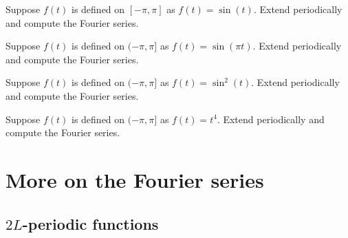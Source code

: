 \setcounter{exercise}{100}

\begin{exercise}
Suppose $f(t)$ is defined on $[-\pi,\pi]$ as $f(t) = \sin(t)$.  Extend
periodically and compute the Fourier series.
\end{exercise}

\begin{exercise}
Suppose $f(t)$ is defined on $(-\pi,\pi]$ as $f(t) = \sin(\pi t)$.  Extend
periodically and compute the Fourier series.
\end{exercise}

\begin{exercise}
Suppose $f(t)$ is defined on $(-\pi,\pi]$ as $f(t) = \sin^2(t)$.
Extend
periodically and compute the Fourier series.
\end{exercise}

\begin{exercise}
Suppose $f(t)$ is defined on $(-\pi,\pi]$ as $f(t) = t^4$.
Extend periodically and compute the Fourier series.
\end{exercise}


\sectionnewpage
\section{More on the Fourier series}



\subsection{$2L$-periodic functions}

